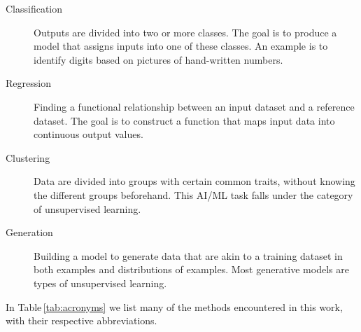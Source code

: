 \documentclass[aps,rmp,reprint,amsmath,amssymb,graphicx,longbibliography]{revtex4-1}
\begin{document}
\begin{description}
    \item[Classification] Outputs are divided into two or more classes. The goal is to produce a model that assigns inputs into one of these classes. An example is to identify digits based on pictures of hand-written numbers.
\item[Regression] Finding a functional relationship between an input dataset and a reference dataset. The goal is to construct a function that maps input data into continuous output values.
\item[Clustering] Data are divided into groups with certain common traits, without knowing the different groups beforehand. This AI/ML task falls  under the category of unsupervised learning.
\item[Generation] Building a model to generate data that are akin to a training dataset in both examples and distributions of examples. Most generative models are types of unsupervised learning.
\end{description}
In Table\,\ref{tab:acronyms} we list many of the methods encountered in this work, with their respective abbreviations.
\end{document}
